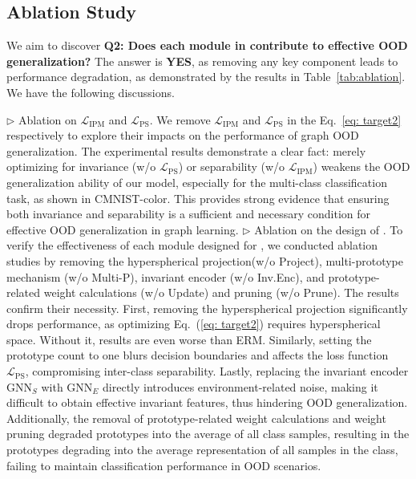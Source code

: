 \subsection{Ablation Study}
We aim to discover 
\textbf{Q2: Does each module in \ourmethod contribute to effective OOD generalization?} The answer is \textbf{YES}, as removing any key component leads to performance degradation, as demonstrated by the results in Table~\ref{tab:ablation}. We have the following discussions.%


\noindent$\rhd$ \textsf{Ablation on $\mathcal{L}_{\mathrm{IPM}}$ and $\mathcal{L}_{\mathrm{PS}}$.}
We remove $\mathcal{L}_{\mathrm{IPM}}$ and $\mathcal{L}_{\mathrm{PS}}$ in the Eq.~\eqref{eq: target2} respectively to explore their impacts on the performance of graph OOD generalization. The experimental results demonstrate a clear fact: merely optimizing for invariance (w/o $\mathcal{L}_{\mathrm{PS}}$) or separability (w/o $\mathcal{L}_{\mathrm{IPM}}$) weakens the OOD generalization ability of our model, especially for the multi-class classification task, as shown in CMNIST-color. This provides strong evidence that ensuring both invariance and separability is a sufficient and necessary condition for effective OOD generalization in graph learning.
\noindent$\rhd$ \textsf{Ablation on the design of \ourmethod.} To verify the effectiveness of each module designed for \ourmethod,
we conducted ablation studies by removing the hyperspherical projection(w/o Project), multi-prototype mechanism (w/o Multi-P), invariant encoder (w/o Inv.Enc), and prototype-related weight calculations (w/o Update) and pruning (w/o Prune). The results confirm their necessity. First, removing the hyperspherical projection significantly drops performance, as optimizing Eq.~(\ref{eq: target2}) requires hyperspherical space. Without it, results are even worse than ERM. Similarly, setting the prototype count to one blurs decision boundaries and affects the loss function $\mathcal{L}_{\mathrm{PS}}$, compromising inter-class separability. Lastly, replacing the invariant encoder $\mathrm{GNN}_{S}$ with $\mathrm{GNN}_{E}$ directly introduces environment-related noise, making it difficult to obtain effective invariant features, thus hindering OOD generalization.
Additionally, the removal of prototype-related weight calculations and weight pruning degraded prototypes into the average of all class samples, resulting in the prototypes degrading into the average representation of all samples in the class, failing to maintain classification performance in OOD scenarios.

